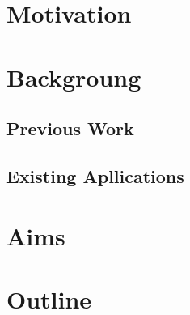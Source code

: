 \section{Motivation}
\section{Backgroung}
\subsection{Previous Work}
\subsection{Existing Apllications}
\section{Aims}
\section{Outline}